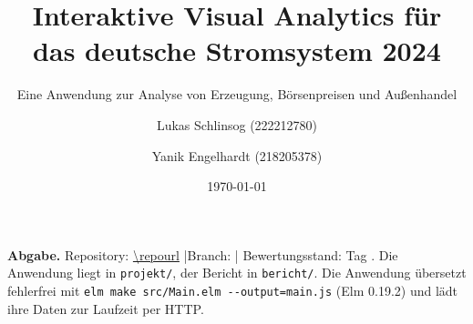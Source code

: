 \documentclass[usegeometry=true]{scrartcl}
\begin{document}
\subject{Projektbericht zum Modul Information Visualisierung Sommersemester 2026}
\title{Interaktive Visual Analytics für das deutsche Stromsystem 2024}
\subtitle{Eine Anwendung zur Analyse von Erzeugung, Börsenpreisen und Außenhandel}
\author{Lukas Schlinsog (222212780) \and Yanik Engelhardt (218205378)}
\date{\today}
\maketitle

\begin{center}
\begin{minipage}{0.86\textwidth}
\small
\textbf{Abgabe.} Repository: \url{\repourl} \quad|\quad Branch: \texttt{\repobranch} \quad|\quad
Bewertungsstand: Tag \texttt{\repotag}. Die Anwendung liegt in \texttt{projekt/}, der Bericht in
\texttt{bericht/}. Die Anwendung übersetzt fehlerfrei mit
\texttt{elm make src/Main.elm -{}-output=main.js} (Elm 0.19.2) und lädt ihre Daten zur Laufzeit per HTTP.
\end{minipage}
\end{center}

\tableofcontents
\newpage










\printbibliography
\end{document}
